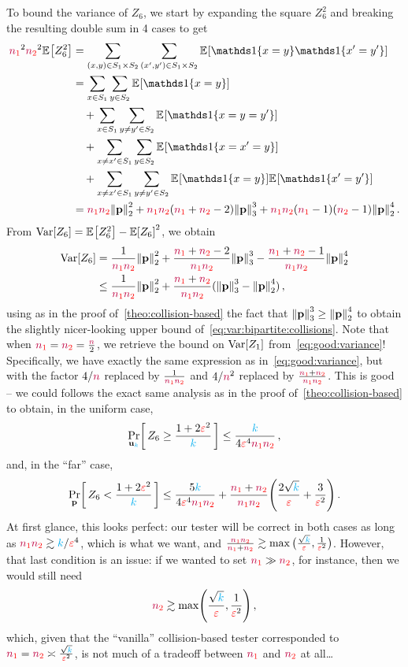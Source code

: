 To bound the variance of $Z_6$, we start by expanding the square $Z_6^2$ and breaking the resulting double sum in 4 cases to get
\begin{align*}
  \nss^2 \nst^2 \bEE{Z_6^2}
  &= \sum_{(x,y)\in S_1\times S_2}\sum_{(x',y')\in S_1\times S_2} \bEE{\indic{x=y}\indic{x'=y'}} \\
  &= \sum_{x\in S_1}\sum_{y\in S_2}\bEE{\indic{x=y}}\\
  &\quad+ \sum_{x\in S_1}\sum_{y\neq y'\in S_2}\bEE{\indic{x=y=y'}} \\
  &\quad+ \sum_{x\neq x'\in S_1}\sum_{y\in S_2}\bEE{\indic{x=x'=y}} \\
  &\quad+\sum_{x\neq x'\in S_1}\sum_{y \neq y'\in S_2} \bEE{\indic{x=y}}\bEE{\indic{x'=y'}}  \\
  &= \nss\nst \normtwo{\p}^2 + \nss \nst(\nss+\nst-2) \norm{\p}_3^3 + \nss\nst(\nss-1)(\nst-1) \normtwo{\p}^4\,.
\end{align*}
From $\Var[Z_6] = \bEE{Z_6^2} - \expect{Z_6}^2$, we obtain
\begin{align}
  \Var[Z_6] 
  &= \frac{1}{\nss\nst}\normtwo{\p}^2 + \frac{\nss+\nst-2}{\nss\nst}\norm{\p}_3^3 - \frac{\nss+\nst-1}{\nss\nst}\normtwo{\p}^4 \notag\\
  &\leq \frac{1}{\nss\nst}\normtwo{\p}^2 + \frac{\nss+\nst}{\nss\nst}(\norm{\p}_3^3-\normtwo{\p}^4) \label{eq:var:bipartite:collisions}\,,
\end{align}
using as in the proof of~\cref{theo:collision-based} the fact that $\norm{\p}_3^3 \geq \normtwo{\p}^4$ to obtain the slightly nicer-looking upper bound of~\cref{eq:var:bipartite:collisions}. Note that when $\textcolor{red}{{\textcolor{purple}{n}}_1}=\textcolor{red}{{\textcolor{purple}{n}}_2}=\frac{{\textcolor{purple}{n}}}{2}$, we retrieve the bound on $\operatorname{Var}[Z_1]$ from~\cref{eq:good:variance}! Specifically, we have exactly the same expression as in~\cref{eq:good:variance}, but with the factor $4/{\textcolor{purple}{n}}$ replaced by $\frac{1}{\textcolor{red}{{\textcolor{purple}{n}}_1}\textcolor{red}{{\textcolor{purple}{n}}_2}}$ and $4/{\textcolor{purple}{n}}^2$ replaced by $\frac{\textcolor{red}{{\textcolor{purple}{n}}_1}+\textcolor{red}{{\textcolor{purple}{n}}_2}}{\textcolor{red}{{\textcolor{purple}{n}}_1}\textcolor{red}{{\textcolor{purple}{n}}_2}}$. This is good -- we could follows the exact same analysis as in the proof of~\cref{theo:collision-based} to obtain, in the uniform case,
\[
  \probaDistrOf{\uniform_\ab}{ Z_6 \geq \frac{1+2\dst^2}{\ab} }
  \leq \frac{\ab}{4\dst^4\nss\nst}\,, 
\]
and, in the ``far'' case,
\[
  \probaDistrOf{\p}{ Z_6 < \frac{1+2\dst^2}{\ab} }
  \leq \frac{5\ab}{4\dst^4\nss\nst} + \frac{\nss+\nst}{\nss\nst}\Paren{\frac{2\sqrt{\ab}}{\dst}+\frac{3}{\dst^2}}\,.
\]
At first glance, this looks perfect: our tester will be correct in both cases as long as $\textcolor{red}{{\textcolor{purple}{n}}_1}\textcolor{red}{{\textcolor{purple}{n}}_2} \gtrsim {\textcolor{cyan}{k}}/\textcolor{red}{\varepsilon}^4$, which is what we want, and $\frac{\textcolor{red}{{\textcolor{purple}{n}}_1}\textcolor{red}{{\textcolor{purple}{n}}_2}}{\textcolor{red}{{\textcolor{purple}{n}}_1}+\textcolor{red}{{\textcolor{purple}{n}}_2}} \gtrsim \max\big(\frac{\sqrt{{\textcolor{cyan}{k}}}}{\textcolor{red}{\varepsilon}}, \frac{1}{\textcolor{red}{\varepsilon}^2}\big)$. However, that last condition is an issue: if we wanted to set $\textcolor{red}{{\textcolor{purple}{n}}_1}\gg \textcolor{red}{{\textcolor{purple}{n}}_2}$, for instance, then we would still need
\[
    \nst \gtrsim \max\Paren{\frac{\sqrt{\ab}}{\dst}, \frac{1}{\dst^2} }\,,
\]
which, given that the ``vanilla'' collision-based tester corresponded to $\textcolor{red}{{\textcolor{purple}{n}}_1}=\textcolor{red}{{\textcolor{purple}{n}}_2} \asymp \frac{\sqrt{{\textcolor{cyan}{k}}}}{\textcolor{red}{\varepsilon}^2}$, is not much of a tradeoff between $\textcolor{red}{{\textcolor{purple}{n}}_1}$ and $\textcolor{red}{{\textcolor{purple}{n}}_2}$ at all\dots

